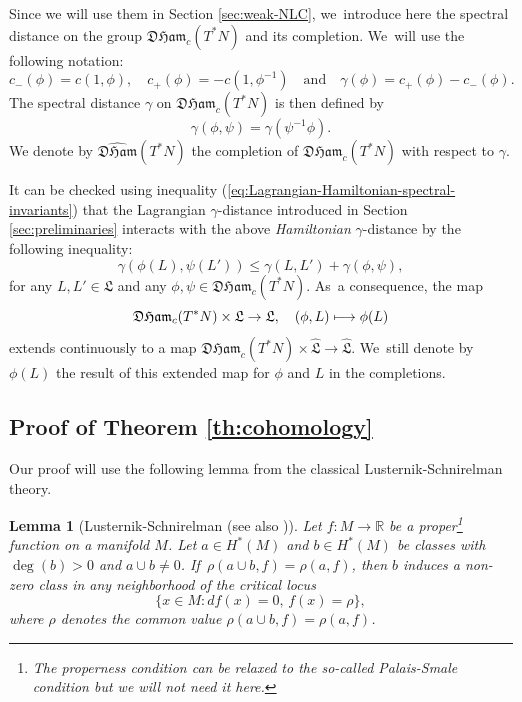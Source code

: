 \documentclass[10pt]{amsart}
\newcommand\mto{\mathchoice{\longmapsto}{\mapsto}{\mapsto}{\mapsto}}
\newtheorem{lem}[thm]{Lemma}
\theoremstyle{definition}
\newcommand{\R}{\mathbb{R}}
\newcommand{\DHam}{\mathfrak{DHam}}
\newcommand{\fL}{\mathfrak {L}}
\newcommand{\hatL}{\widehat{\fL}}
\newcommand{\hatDHam}{\widehat{\DHam}}
\begin{document}
Since we will use them in Section \ref{sec:weak-NLC}, we~introduce here the spectral distance on the group $\DHam_c(T^*N)$ and its completion. We~will use the following notation:\vspace*{-3pt}\enlargethispage{\baselineskip}
\[
c_-(\phi)=c(1, \phi),\quad c_+(\phi)=-c(1, \phi^{-1}) \quad\text{and}\quad \gamma(\phi)=c_+(\phi)-c_-(\phi).
\]
The spectral distance $\gamma$ on $\DHam_c(T^*N)$ is then defined by\vspace*{-3pt}
\[
\gamma(\phi, \psi)=\gamma(\psi^{-1}\phi).
\]
We denote by $\hatDHam(T^*N)$ the completion of $\DHam_c(T^*N)$ with respect to $\gamma$.

It can be checked using inequality (\ref{eq:Lagrangian-Hamiltonian-spectral-invariants}) that the Lagrangian $\gamma$\nobreakdash-distance introduced in Section \ref{sec:preliminaries} interacts with the above \emph{Hamiltonian} $\gamma$\nobreakdash-distance by the following \hbox{inequality}:\vspace*{-3pt}
\begin{equation*}\label{eq:ham-lag-gamma}
\gamma(\phi(L), \psi(L'))\leq \gamma(L,L')+\gamma(\phi, \psi),
\end{equation*}
for any $L, L'\in\fL$ and any $\phi, \psi\in\DHam_c(T^*N)$. As~a consequence, the map\vspace*{-3pt}
\[
\DHam_c(T^*N)\times \fL\to\fL,\quad (\phi,L)\mto\phi(L)
\]
extends continuously to a map $\hatDHam_c(T^*N)\times \hatL\to\hatL$. We~still denote by $\phi(L)$ the result of this extended map for $\phi$ and $L$ in the completions.

\subsection{Proof of Theorem \ref{th:cohomology}}\label{sec:proof-cohomology}

Our proof will use the following lemma from the classical Lusternik-Schnirelman theory.

\begin{lem}[Lusternik-Schnirelman \cite{Lusternik-Schnirelman}(see also \cite{Viterbo-Montreal})]\label{lem:Lusternik-Schnirelman} Let $f:M\to\R$ be a proper\footnote{The properness condition can be relaxed to the so-called Palais-Smale condition but we will not need it here.} function on a manifold $M$. Let $a\in H^*(M)$ and $b\in H^*(M)$ be classes with $\deg(b)>0$ and $a\cup b\neq 0$. If~$\rho(a\cup b,f)=\rho(a, f)$, then $b$ induces a non-zero class in any neighborhood of the critical locus\vspace*{-3pt}
\[
\{x\in M: df(x)=0,\, f(x)=\rho\},
\]
where $\rho$ denotes the common value $\rho(a\cup b,f)=\rho(a, f)$.
\end{lem}
\end{document}

